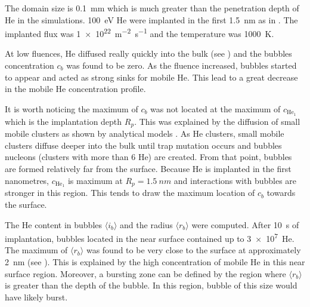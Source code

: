 The domain size is \SI{0.1}{mm} which is much greater than the penetration depth of He in the simulations.
\SI{100}{eV} He were implanted in the first \SI{1.5}{nm} as in .
The implanted flux was \SI{1e22}{m^{-2} s^{-1}} and the temperature was \SI{1000}{K}.

At low \glspl{fluence}, He diffused really quickly into the bulk (see ) and the bubbles concentration $c_b$ was found to be zero.
As the \gls{fluence} increased, bubbles started to appear and acted as strong sinks for mobile He.
This lead to a great decrease in the mobile He concentration profile.

It is worth noticing the maximum of $c_b$ was not located at the maximum of $c_{\mathrm{He}_1}$ which is the implantation depth $R_p$.
This was explained by the diffusion of small mobile clusters as shown by analytical models .
As He clusters, small mobile clusters diffuse deeper into the bulk until \gls{trap mutation} occurs and bubbles nucleons (clusters with more than 6 He) are created.
From that point, bubbles are formed relatively far from the surface.
Because He is implanted in the first nanometres, $c_{\mathrm{He}_1}$ is maximum at $R_p = \SI{1.5}{nm}$ and interactions with bubbles are stronger in this region.
This tends to draw the maximum location of $c_b$ towards the surface.

The He content in bubbles $\langle i_b \rangle$ and the radius $\langle r_b \rangle$ were computed.
After \SI{10}{s} of implantation, bubbles located in the near surface contained up to \SI{3e7}{He}.
The maximum of $\langle r_b \rangle$ was found to be very close to the surface at approximately \SI{2}{nm} (see ).
This is explained by the high concentration of mobile He in this near surface region.
Moreover, a bursting zone can be defined by the region where $\langle r_b \rangle$ is greater than the depth of the bubble.
In this region, bubble of this size would have likely burst.

